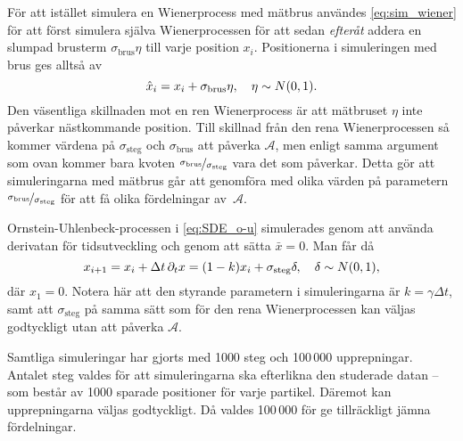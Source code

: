 För att istället simulera en Wienerprocess med mätbrus användes \eqref{eq:sim_wiener} för att först simulera själva Wienerprocessen för att sedan \emph{efteråt} addera en slumpad brusterm $\sigma_\text{brus}\eta$ till varje position $x_i$. Positionerna i simuleringen med brus ges alltså av
\begin{equation}
\hat{x}_{i} = x_i + \sigma_\text{brus}\eta 
\qcomma  \eta \sim N(0, 1).
\end{equation}
Den väsentliga skillnaden mot en ren Wienerprocess är att mätbruset $\eta$ inte påverkar nästkommande position. Till skillnad från den rena Wienerprocessen så kommer värdena på $\sigma_\text{steg}$ och $\sigma_\text{brus}$ att påverka $\mathcal{A}$, men enligt samma argument som ovan kommer bara kvoten $\nicefrac{\sigma_\text{brus}}{\sigma_\text{steg}}$ vara det som påverkar. Detta gör att simuleringarna med mätbrus går att genomföra med olika värden på parametern $\nicefrac{\sigma_\text{brus}}{\sigma_\text{steg}}$ för att få olika fördelningar av~$\mathcal{A}$. 

Ornstein-Uhlenbeck-processen i \eqref{eq:SDE_o-u} simulerades genom att använda derivatan för tidsutveckling och genom att sätta $\bar{x}=0$. Man får då
\begin{equation}
x_{i+1} = x_i + \Delta{t}\,\pd_{t}x  = (1-k) x_i +  \sigma_\text{steg}\delta 
\qcomma  \delta \sim N(0, 1),
\end{equation}
där $x_1=0$. Notera här att den styrande parametern i simuleringarna är $k=\gamma\Delta{t}$, samt att $\sigma_\text{steg}$ på samma sätt som för den rena Wienerprocessen kan väljas godtyckligt utan att påverka $\mathcal{A}$. 

Samtliga simuleringar har gjorts med 1000 steg och 100\,000 upprepningar. Antalet steg valdes för att simuleringarna ska efterlikna den studerade datan -- som består av 1000 sparade positioner för varje partikel. Däremot kan upprepningarna väljas godtyckligt. Då valdes 100\,000 för ge tillräckligt jämna fördelningar.



